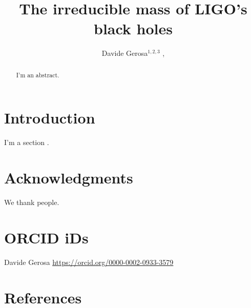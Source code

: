 \documentclass[]{iopart}
\newcommand{\bham}{{School of Physics and Astronomy \& Institute for Gravitational Wave Astronomy, University of Birmingham, Birmingham, B15 2TT, UK}}
\newcommand{\milan}{{Dipartimento di Fisica ``G. Occhialini'', Universit\'a degli Studi di Milano-Bicocca, Piazza della Scienza 3, 20126 Milano, Italy}}
\newcommand{\infn}{{INFN, Sezione di Milano-Bicocca, Piazza della Scienza 3, 20126 Milano, Italy}}
\begin{document}
\begin{center}
\title[D.~Gerosa et al.]{The irreducible mass of LIGO's black holes}
\end{center}

\author{
Davide Gerosa$^{1,2,3}$ ,
}
\vspace{0.1cm}
\address{$^{1}$~\milan}
\address{$^{2}$~\infn}
\address{$^{3}$~\bham}


\setcounter{footnote}{0}


\begin{abstract}
I'm an abstract. \lipsum[1]
\end{abstract}


\section{Introduction}

I'm a section \cite{2016PhRvL.116f1102A}. \lipsum[2-3]



\section*{Acknowledgments}

We thank people. \lipsum[4]

\section*{ORCID iDs}
Davide Gerosa  \href{https://orcid.org/0000-0002-0933-3579}{https://orcid.org/0000-0002-0933-3579} \\


\section*{References}


\end{document}
